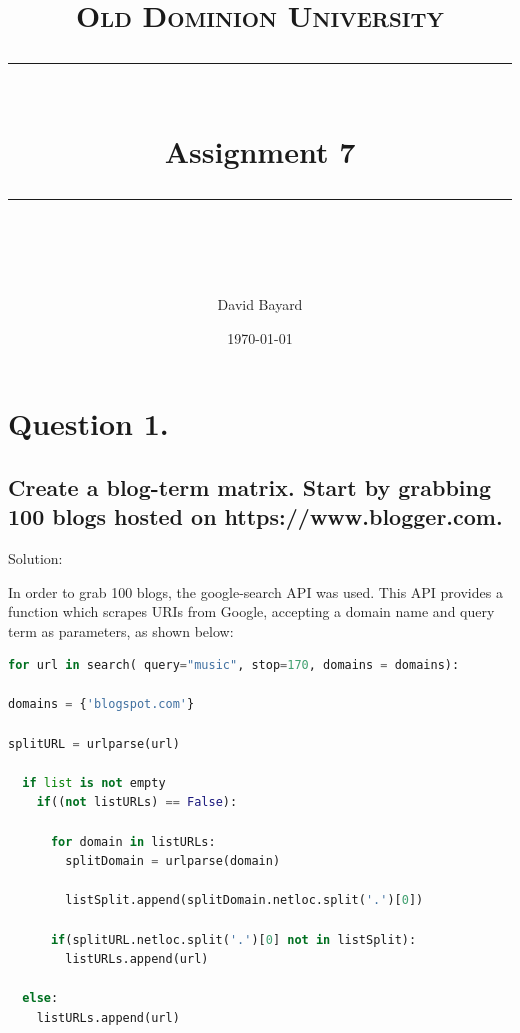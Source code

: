 \documentclass[11pt]{scrartcl} %
\title{
	\normalfont\normalsize
	\textsc{Old Dominion University}\\ %
	\vspace{25pt} %
	\rule{\linewidth}{0.5pt}\\ %
	\vspace{20pt} %
	{\huge Assignment 7}\\ %
	\vspace{12pt} %
	\rule{\linewidth}{2pt}\\ %
	\vspace{12pt} %
}
\author{\LARGE David Bayard} %
\date{\normalsize\today} %
\begin{document}

\lstset{style=pythonStyle}


\maketitle %

\pagebreak
\section*{Question 1.}




\subsection*{Create a blog-term matrix.  Start by grabbing 100 blogs hosted on https://www.blogger.com.}
\bigskip\bigskip


\LARGE Solution:
\newline \small

\tabto{2.0cm} In order to grab 100 blogs, the google-search API was used. This API provides a function which scrapes URIs from Google, accepting a domain name and query term as parameters, as shown below:

\begin{lstlisting}[language = Python, caption=Scraping URIs]
for url in search( query="music", stop=170, domains = domains):

domains = {'blogspot.com'}

splitURL = urlparse(url)

  if list is not empty
    if((not listURLs) == False):

      for domain in listURLs:
        splitDomain = urlparse(domain)

        listSplit.append(splitDomain.netloc.split('.')[0])

      if(splitURL.netloc.split('.')[0] not in listSplit):
        listURLs.append(url)
 
  else:
    listURLs.append(url)
\end{lstlisting} \bigskip 
\end{document}
